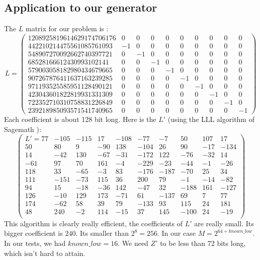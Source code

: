 \documentclass[preprint]{iacrtrans}
\begin{document}
\subsection{Application to our generator}
The $L$ matrix for our problem is :
\begin{equation}
    L=
\begin{pmatrix}
1208925819614629174706176 & 0 &  0 &  0 &  0 &  0 &  0 &  0 &  0 & 0\\
442210214475561085761093 & -1 &  0 &  0 &  0 & 0 &  0 &  0 &  0 &  0\\
548907270092662740397721 & 0 & -1 &  0 &  0 & 0 &  0 &  0 &  0 &  0\\
68528166612430993102141 & 0 &  0 & -1 &  0 & 0 &  0 &  0 &  0 &  0\\
579003058182980434679665 & 0 &  0 &  0 & -1 & 0 &  0 &  0 &  0 &  0\\
907267876411637163239285 & 0 &  0 &  0 &  0 & -1 &  0 &  0 &  0 &  0\\
971193525585951128490121 & 0 &  0 &  0 &  0 & 0 & -1 &  0 &  0 &  0\\
423043601822819931331309 & 0 &  0 &  0 &  0 & 0 &  0 & -1 &  0 &  0\\
722352710310758831226849 & 0 &  0 &  0 &  0 & 0 &  0 &  0 & -1 &  0\\
239218985093571541740965 & 0 &  0 &  0 &  0 & 0 &  0 &  0 &  0 & -1
\end{pmatrix}
\end{equation}
Each coefficient is about 128 bit long. Here is the $L'$ (using the LLL algorithm of Sagemath \cite{sagemath}):
\begin{equation}
\begin{pmatrix}
    L' =
    77 & -105 & -115 &  17 & -108 & -77  & -7 &  50 & 107 &  17\\
     50  & 80 & 9 & -90 &  138 & -104  & 26  & 90 & -17 & -134\\
    14 & -42 & 130 & -67 & -31 & -172 & 122 & -76 & -32 &  14\\
    -61 &  97 &  70 & 161  & -4 & -229 & -23 & -44  & -1 & -26\\
    118  & 33 & -65 &  -3 &  83 & -176 & -187 & -70 &  25 &  34\\
    111 & -151 & -73 & 115 &  36 & 200 &  79  & -1 & -14 & -82\\
    94  & 15 & -18 & -36 & 142 & -47 &  32 & -188 & 161 & -127\\
    126 & -10 & 129 & 173 & -71  & 61 & -137 &  69 & 7 &  77\\
    174 & -62 &  58  & 39 &  79 & -133 &  93 & 115 &  24 & 181\\
    48 & 240 &  -2 & 114 & -15 &  37 & 145 & -100 &  24 & -19\\
\end{pmatrix}
\end{equation}
This algorithm is clearly really efficient, the coefficients of $L'$ are really small. Its bigger coefficient is $240$. Its smaller than $2^8 = 256$. In our case $M = 2^{64 + known\_low}$. In our tests, we had $known\_low = 16$. We need $Z'$ to be less than 72 bits long, which isn't hard to attain.
\end{document}
